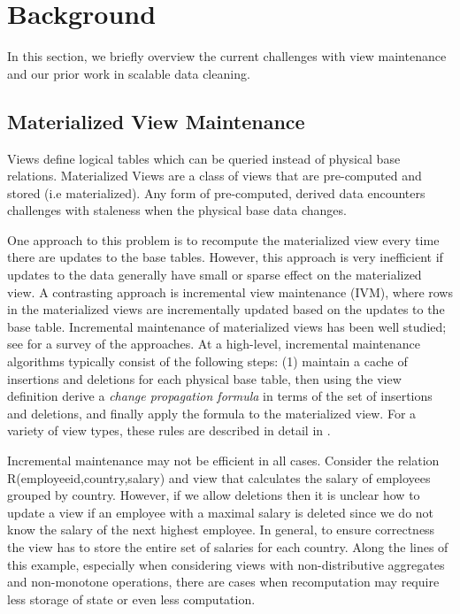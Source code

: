 \section{Background}\label{sec-background}
In this section, we briefly overview the current challenges with view maintenance and
our prior work in scalable data cleaning.

\subsection{Materialized View Maintenance}\label{subsec-inc}
Views define logical tables which can be queried instead of physical base relations.
Materialized Views are a class of views that are pre-computed and stored (i.e materialized).
Any form of pre-computed, derived data encounters challenges with staleness when the physical base data changes.

One approach to this problem is to recompute the materialized view every time there are updates to the base tables.
However, this approach is very inefficient if updates to the data generally have small or sparse effect on the materialized view. 
A contrasting approach is incremental view maintenance (IVM), where rows in the materialized views are incrementally updated based on the updates to the base table.
Incremental maintenance of materialized views has been well studied; see \cite{chirkova2011materialized} for a survey of the approaches. 
At a high-level, incremental maintenance algorithms typically consist of the following steps: (1) maintain a cache of insertions and deletions for each physical base table, then using the view definition derive a \emph{change propagation formula} in terms of the set of insertions and deletions, and finally apply the formula to the materialized view.
For a variety of view types, these rules are described in detail in \cite{DBLP:journals/vldb/KochAKNNLS14, DBLP:conf/pods/Koch10}.

Incremental maintenance may not be efficient in all cases.
Consider the relation R(employeeid,country,salary) and view that calculates the \maxfunc salary of employees grouped by country. 
However, if we allow deletions then it is unclear how to update a view if an employee with a maximal salary is deleted since we do not know the salary of the next highest employee. 
In general, to ensure correctness the view has to store the entire set of salaries for each country.
Along the lines of this example, especially when considering views with non-distributive aggregates and non-monotone operations, there are 
cases when recomputation may require less storage of state or even less computation.

